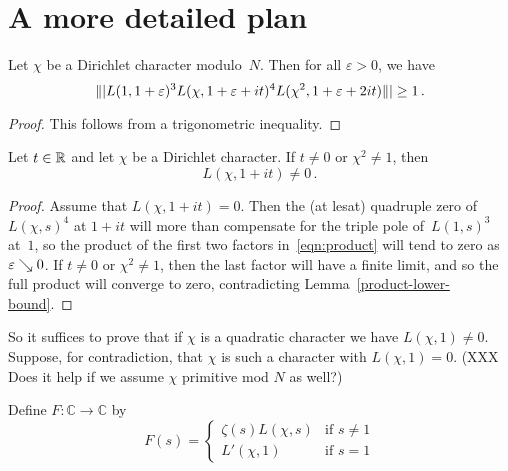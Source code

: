 \section{A more detailed plan}

\begin{lemma} \label{product-lower-bound}
  \leanok
  Let $\chi$ be a Dirichlet character modulo~$N$. Then for all $\varepsilon > 0$, we have
  \begin{equation} \label {eqn:product}
    \||L(1, 1 + \varepsilon)^3 L(\chi, 1 + \varepsilon + it)^4 L(\chi^2, 1 + \varepsilon + 2it)\|| \ge 1 \,.
  \end{equation}
\end{lemma}

\begin{proof}
  \leanok
  This follows from a trigonometric inequality.
\end{proof}

\begin{lemma} \label{non-quadratic}
  Let $t \in \mathbb{R}$ and let $\chi$ be a Dirichlet character. If $t \ne 0$ or $\chi^2 \ne 1$, then
  \[ L(\chi, 1 + it) \ne 0 \,. \]
\end{lemma}

\begin{proof}
  Assume that $L(\chi, 1 + it) = 0$. Then the (at lesat) quadruple zero of~$L(\chi, s)^4$ at $1 + it$
  will more than compensate for the triple pole of~$L(1, s)^3$ at~$1$, so the product of the first
  two factors in~\eqref{eqn:product} will tend to zero as $\varepsilon \searrow 0$.
  If $t \ne 0$ or $\chi^2 \ne 1$, then the last factor will have a finite limit, and so the
  full product will converge to zero, contradicting Lemma~\ref{product-lower-bound}.
\end{proof}


 So it suffices to prove that if $\chi$ is a quadratic character we have $L(\chi, 1) \ne 0$. Suppose, for contradiction, that $\chi$ is such a character with $L(\chi, 1) = 0$. (XXX Does it help if we assume $\chi$ primitive mod $N$ as well?)

 \begin{definition}
  Define $F : \mathbb{C} \to \mathbb{C}$ by
  \[ F(s) = \begin{cases}
   \zeta(s) L(\chi, s) & \text{if $s \ne 1$} \\
   L'(\chi, 1) & \text{if $s = 1$}
   \end{cases}
  \]
 \end{definition}

